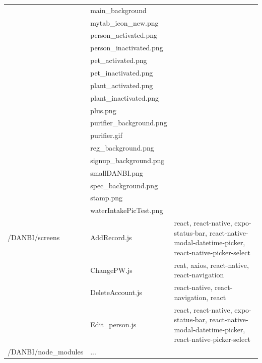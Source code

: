 \documentclass[conference]{IEEEtran}
\begin{document}
\begin{table}[h!]
\begin{threeparttable}
\begin{tabular}{p{2.4cm}p{2.8cm}p{2cm}}
            & main\_background\\
            & mytab\_icon\_new.png\\
            & person\_activated.png\\
            & person\_inactivated.png\\
            & pet\_activated.png\\
            & pet\_inactivated.png\\
            & plant\_activated.png\\
            & plant\_inactivated.png\\
            & plus.png\\
            & purifier\_background.png\\
            & purifier.gif\\
            & reg\_background.png\\
            & signup\_background.png\\
            & smallDANBI.png\\
            & spec\_background.png\\
            & stamp.png\\
            & waterIntakePicTest.png\\
            \hline
            /DANBI/screens
            & AddRecord.js& react, react-native, expo-status-bar, react-native-modal-datetime-picker, react-native-picker-select\\
            & ChangePW.js& reat, axios, react-native, react-navigation\\
            & DeleteAccount.js& react-native, react-navigation, react\\
            & Edit\_person.js& react, react-native, expo-status-bar, react-native-modal-datetime-picker, react-native-picker-select\\
        \hline
        /DANBI/node\_modules& ...\\  
            \bottomrule
            \end{tabular}
        \end{threeparttable}
    \end{table}
    
\end{document}
